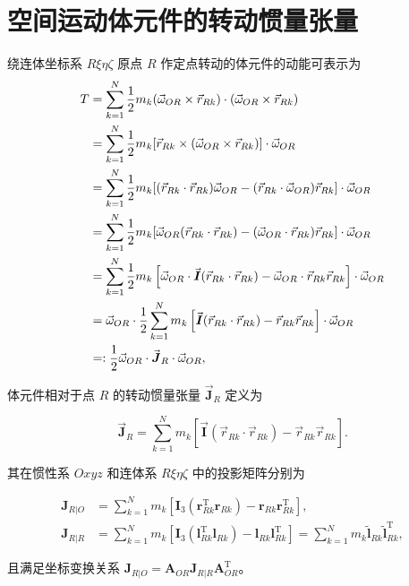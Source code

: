 \section{空间运动体元件的转动惯量张量}
绕连体坐标系 $R\xi\eta\zeta$ 原点 $R$ 作定点转动的体元件的动能可表示为
\begin{align*}T &= \sum_{k=1}^{N} \frac{1}{2} m_k (\vec{\omega}_{OR} \times \vec{r}_{Rk}) \cdot (\vec{\omega}_{OR} \times \vec{r}_{Rk}) \notag \\
&= \sum_{k=1}^{N} \frac{1}{2} m_k [\vec{r}_{Rk} \times (\vec{\omega}_{OR} \times \vec{r}_{Rk})] \cdot \vec{\omega}_{OR} \notag \\
&= \sum_{k=1}^{N} \frac{1}{2} m_k [(\vec{r}_{Rk} \cdot \vec{r}_{Rk}) \vec{\omega}_{OR} - (\vec{r}_{Rk} \cdot \vec{\omega}_{OR}) \vec{r}_{Rk}] \cdot \vec{\omega}_{OR} \notag \\
&= \sum_{k=1}^{N} \frac{1}{2} m_k [\vec{\omega}_{OR} (\vec{r}_{Rk} \cdot \vec{r}_{Rk}) - (\vec{\omega}_{OR} \cdot \vec{r}_{Rk}) \vec{r}_{Rk}] \cdot \vec{\omega}_{OR} \notag \\
&= \sum_{k=1}^{N} \frac{1}{2} m_k \left[ \vec{\omega}_{OR} \cdot \vec{\boldsymbol{I}} (\vec{r}_{Rk} \cdot \vec{r}_{Rk}) - \vec{\omega}_{OR} \cdot \vec{r}_{Rk} \vec{r}_{Rk} \right] \cdot \vec{\omega}_{OR} \notag \\
&= \vec{\omega}_{OR} \cdot \frac{1}{2} \sum_{k=1}^{N} m_k \left[ \vec{\boldsymbol{I}} (\vec{r}_{Rk} \cdot \vec{r}_{Rk}) - \vec{r}_{Rk} \vec{r}_{Rk} \right] \cdot \vec{\omega}_{OR} \notag \\
&=: \frac{1}{2} \vec{\omega}_{OR} \cdot \vec{\boldsymbol{J}}_R \cdot \vec{\omega}_{OR},\end{align*}
\begin{definition}[定义 8.5（转动惯量张量）]
体元件相对于点 $R$ 的转动惯量张量 $\vec{\boldsymbol{J}}_R$ 定义为

\[
\vec{\boldsymbol{J}}_R = \sum_{k=1}^{N} m_k \left[ \vec{\boldsymbol{I}} (\vec{r}_{Rk} \cdot \vec{r}_{Rk}) - \vec{r}_{Rk} \vec{r}_{Rk} \right].
\]

其在惯性系 $Oxyz$ 和连体系 $R\xi\eta\zeta$ 中的投影矩阵分别为

\begin{align*}\boldsymbol{J}_{R|O} &= \sum_{k=1}^{N} m_k \left[ \boldsymbol{I}_3 (\boldsymbol{r}_{Rk}^{\mathrm{T}} \boldsymbol{r}_{Rk}) - \boldsymbol{r}_{Rk} \boldsymbol{r}_{Rk}^{\mathrm{T}} \right], \\
\boldsymbol{J}_{R|R} &= \sum_{k=1}^{N} m_k \left[ \boldsymbol{I}_3 (\boldsymbol{l}_{Rk}^{\mathrm{T}} \boldsymbol{l}_{Rk}) - \boldsymbol{l}_{Rk} \boldsymbol{l}_{Rk}^{\mathrm{T}} \right] = \sum_{k=1}^{N} m_k \tilde{\boldsymbol{l}}_{Rk} \tilde{\boldsymbol{l}}_{Rk}^{\mathrm{T}},\end{align*}

且满足坐标变换关系 $\boldsymbol{J}_{R|O} = \boldsymbol{A}_{OR} \boldsymbol{J}_{R|R} \boldsymbol{A}_{OR}^{\mathrm{T}}$。
\end{definition}
